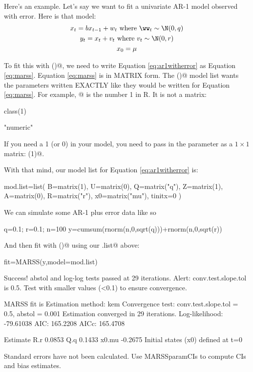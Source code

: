 Here's an example.  Let's say we want to fit a univariate AR-1 model observed with error. Here is that model:
\begin{equation}
\begin{gathered}
x_t = b x_{t-1} + w_t \text{ where } \ww_t \sim \N(0,q) \\
y_t = x_t+v_t \text{ where } v_t \sim \N(0,r) \\
x_0 = \mu
\end{gathered}   
\label{eq:ar1witherror}
\end{equation}

To fit this with \verb@MARSS()@, we need to write Equation \ref{eq:ar1witherror} as Equation \ref{eq:marss}.  Equation \ref{eq:marss} is in MATRIX form.  The \verb@MARSS()@ model list wants the parameters written EXACTLY like they would be written for Equation \ref{eq:marss}.  For example, @ is the number 1 in R.  It is not a matrix:
\begin{Schunk}
\begin{Sinput}
 class(1)
\end{Sinput}
\begin{Soutput}
[1] "numeric"
\end{Soutput}
\end{Schunk}
If you need a 1 (or 0) in your model, you need to pass in the parameter as a $1 \times 1$ matrix: \verb@matrix(1)@.

With that mind, our model list for Equation \ref{eq:ar1witherror} is:
\begin{Schunk}
\begin{Sinput}
 mod.list=list(
 B=matrix(1), U=matrix(0), Q=matrix("q"),
 Z=matrix(1), A=matrix(0), R=matrix("r"),
 x0=matrix("mu"), tinitx=0 )
\end{Sinput}
\end{Schunk}

We can simulate some AR-1 plus error data like so
\begin{Schunk}
\begin{Sinput}
 q=0.1; r=0.1; n=100
 y=cumsum(rnorm(n,0,sqrt(q)))+rnorm(n,0,sqrt(r))
\end{Sinput}
\end{Schunk}
And then fit with \verb@MARSS()@ using our \verb@mod.list@ above:
\begin{Schunk}
\begin{Sinput}
 fit=MARSS(y,model=mod.list)
\end{Sinput}
\begin{Soutput}
Success! abstol and log-log tests passed at 29 iterations.
Alert: conv.test.slope.tol is 0.5.
Test with smaller values (<0.1) to ensure convergence.

MARSS fit is
Estimation method: kem 
Convergence test: conv.test.slope.tol = 0.5, abstol = 0.001
Estimation converged in 29 iterations. 
Log-likelihood: -79.61038 
AIC: 165.2208   AICc: 165.4708   
 
      Estimate
R.r     0.0853
Q.q     0.1433
x0.mu  -0.2675
Initial states (x0) defined at t=0

Standard errors have not been calculated. 
Use MARSSparamCIs to compute CIs and bias estimates.
\end{Soutput}
\end{Schunk}

